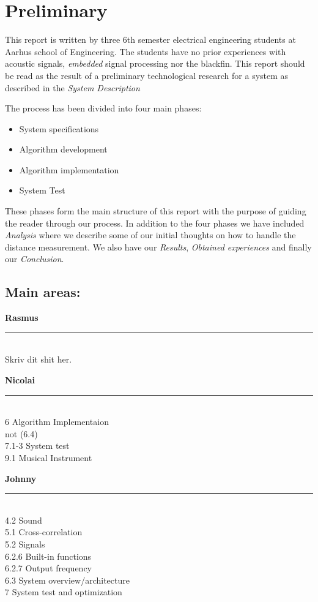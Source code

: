 \chapter{Preliminary}
This report is written by three 6th semester electrical engineering students at Aarhus school of Engineering. The students have no prior experiences with acoustic signals, \textit{embedded} signal processing nor the blackfin. This report should be read as the result of a preliminary technological research for a system as described in the \textit{System Description}

The process has been divided into four main phases:
\begin{itemize}
\item System specifications
\item Algorithm development
\item Algorithm implementation
\item System Test
\end{itemize}

These phases form the main structure of this report with the purpose of guiding the reader through our process. In addition to the four phases we have included \textit{Analysis} where we describe some of our initial thoughts on how to handle the distance measurement. We also have our \textit{Results}, \textit{Obtained experiences} and finally our \textit{Conclusion}.

\section{Main areas:}
\begin{minipage}{0.31\columnwidth}
\begin{center}
\textbf{Rasmus}
\end{center}
\hrule
\ \\
Skriv dit shit her.
\end{minipage}
\hfill
\vline
\hfill
\begin{minipage}{0.31\columnwidth}
\begin{center}
\textbf{Nicolai}
\end{center}
\hrule
\ \\
6 Algorithm Implementaion\\
 not (6.4)\\
7.1-3 System test\\
9.1 Musical Instrument\\
\end{minipage}
\hfill
\vline
\hfill
\begin{minipage}{0.31\columnwidth}
\begin{center}
\textbf{Johnny}
\end{center}
\hrule
\ \\
4.2 Sound\\
5.1 Cross-correlation\\
5.2 Signals\\
6.2.6 Built-in functions\\
6.2.7 Output frequency\\
6.3 System overview/architecture\\
7 System test and optimization

\end{minipage}